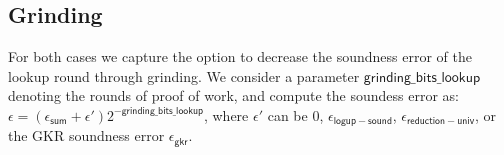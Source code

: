 \subsection{Grinding}

For both cases we capture the option to decrease the soundness error of the lookup round through grinding. We consider a parameter $\mathsf{grinding\_bits\_lookup}$ denoting the rounds of proof of work, and compute the soundess error as: $\epsilon=(\epsilon_{\mathsf{sum}}+\epsilon')2^{\mathsf{-grinding\_bits\_lookup}}$, where $\epsilon'$ can be $0$, $\epsilon_{\mathsf{logup-sound}}$, $\epsilon_{\mathsf{reduction-univ}}$, or the GKR soundness error $\epsilon_{\mathsf{gkr}}.$


